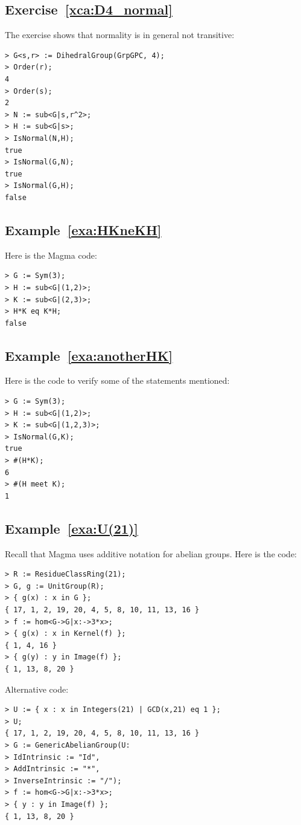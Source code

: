 \subsection*{Exercise~\ref{xca:D4_normal}}

The exercise shows that normality is in general not transitive: 
\begin{lstlisting}
> G<s,r> := DihedralGroup(GrpGPC, 4);
> Order(r);
4
> Order(s);
2
> N := sub<G|s,r^2>;
> H := sub<G|s>;
> IsNormal(N,H);
true
> IsNormal(G,N);
true
> IsNormal(G,H);
false    
\end{lstlisting}

\subsection*{Example~\ref{exa:HKneKH}}

Here is the Magma code:
\begin{lstlisting}
> G := Sym(3);
> H := sub<G|(1,2)>;
> K := sub<G|(2,3)>;
> H*K eq K*H;
false    
\end{lstlisting}

\subsection*{Example~\ref{exa:anotherHK}}

Here is the code to verify some of the statements mentioned: 
\begin{lstlisting}
> G := Sym(3);
> H := sub<G|(1,2)>;
> K := sub<G|(1,2,3)>;
> IsNormal(G,K);
true
> #(H*K);
6
> #(H meet K);
1    
\end{lstlisting}

\subsection*{Example~\ref{exa:U(21)}}

Recall that Magma uses additive notation for abelian groups. Here is the code: 
\begin{lstlisting}
> R := ResidueClassRing(21);
> G, g := UnitGroup(R);    
> { g(x) : x in G };
{ 17, 1, 2, 19, 20, 4, 5, 8, 10, 11, 13, 16 }
> f := hom<G->G|x:->3*x>;
> { g(x) : x in Kernel(f) };
{ 1, 4, 16 }
> { g(y) : y in Image(f) };
{ 1, 13, 8, 20 }
\end{lstlisting}
Alternative code:
\begin{lstlisting}
> U := { x : x in Integers(21) | GCD(x,21) eq 1 };
> U;
{ 17, 1, 2, 19, 20, 4, 5, 8, 10, 11, 13, 16 }
> G := GenericAbelianGroup(U: 
> IdIntrinsic := "Id", 
> AddIntrinsic := "*", 
> InverseIntrinsic := "/");
> f := hom<G->G|x:->3*x>;
> { y : y in Image(f) };
{ 1, 13, 8, 20 }    
\end{lstlisting}

